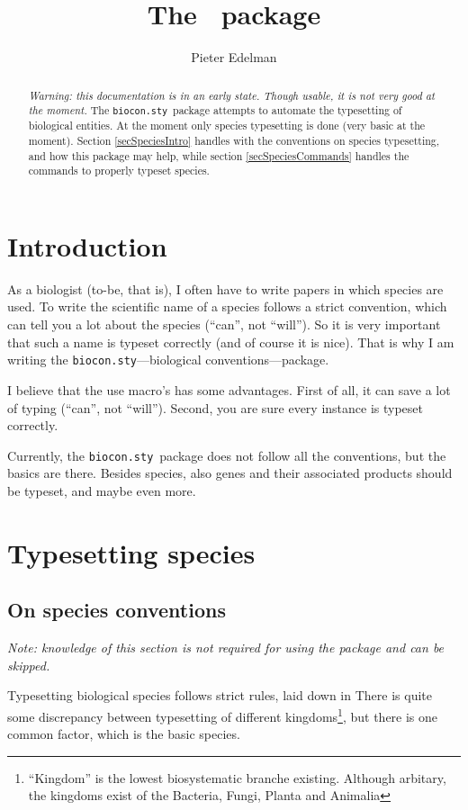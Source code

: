 \documentclass[a4paper]{article}
\title{The \biocon\ package}
\author{Pieter Edelman}
\newcommand{\biocon}{{\tt biocon.sty}}
\begin{document}
  \maketitle

  \begin{abstract}
    \emph{Warning: this documentation is in an early state. Though usable, it is not very good at the moment.}
    The \biocon\ package attempts to automate the typesetting of biological entities. At the moment only species typesetting is done (very basic at the moment). Section \ref{secSpeciesIntro} handles with the conventions on species typesetting, and how this package may help, while section \ref{secSpeciesCommands} handles the commands to properly typeset species.
  \end{abstract}
  
  \tableofcontents
  
  \section{Introduction}
    As a biologist (to-be, that is), I often have to write papers in which species are used. To write the scientific name of a species follows a strict convention, which can tell you a lot about the species (``can'', not ``will''). So it is very important that such a name is typeset correctly (and of course it is nice). That is why I am writing the \biocon---biological conventions---package.
    
    I believe that the use macro's has some advantages. First of all, it can save a lot of typing (``can'', not ``will''). Second, you are sure every instance is typeset correctly.
    
    Currently, the \biocon\ package does not follow all the conventions, but the basics are there. Besides species, also genes and their associated products should be typeset, and maybe even more.
  
  \section{Typesetting species}
    \subsection{On species conventions}\label{secSpeciesIntro}
      \emph{Note: knowledge of this section is not required for using the package and can be skipped.}
      
      Typesetting biological species follows strict rules, laid down in \cite{ICBN} There is quite some discrepancy between typesetting of different kingdoms\footnote{``Kingdom'' is the lowest biosystematic branche existing. Although arbitary, the kingdoms exist of the Bacteria, Fungi, Planta and Animalia}, but there is one common factor, which is the basic species.
      
\end{document}
